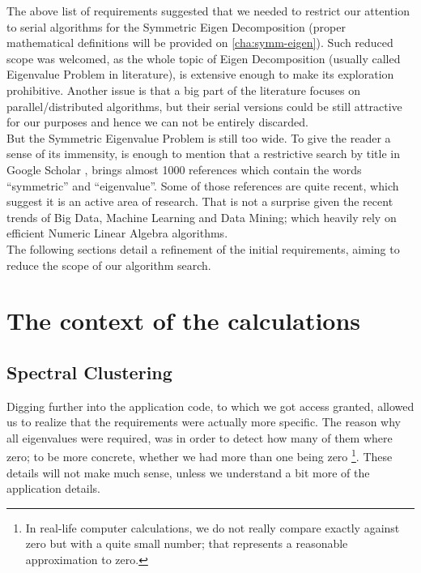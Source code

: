 The above list of requirements suggested that we needed to restrict
our attention to serial algorithms for the Symmetric Eigen
Decomposition (proper mathematical definitions will be provided on
\cref{cha:symm-eigen}). Such reduced scope was welcomed, as the whole
topic of Eigen Decomposition (usually called Eigenvalue Problem in
literature), is extensive enough to make its exploration prohibitive.
Another issue is that a big part of the literature focuses on
parallel/distributed algorithms, but their serial versions could be
still attractive for our purposes and hence we can not be entirely
discarded. \\  

But the Symmetric Eigenvalue Problem is still too wide. To give
the reader a sense of its immensity, is enough to mention that a
restrictive search by title in Google Scholar
\cite{googlescholar}, brings almost 1000 references which contain the
words ``symmetric'' and ``eigenvalue''. Some of those references
are quite recent, which suggest it is an active area of research. That is
not a surprise given the recent trends of Big Data, Machine Learning
and Data Mining; which heavily rely on efficient Numeric Linear
Algebra algorithms. \\

The following sections detail a refinement of the initial
requirements, aiming to reduce the scope of our algorithm search. 

\section{The context of the calculations}

\subsection{Spectral Clustering}
Digging further into the application code, to which we got access
granted, allowed us to realize that the requirements were actually
more specific. The reason why all eigenvalues were required, was in
order to detect how many of them where zero; to be more concrete,
whether we had more than one being zero \footnote{In real-life
  computer calculations, we do not really compare exactly against
  zero but with a quite small number; that represents a reasonable
  approximation to zero.}. These details
will not make much sense, unless we understand a bit more of the
application details. \\

